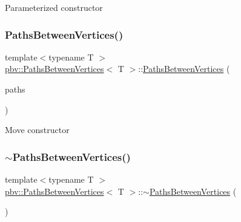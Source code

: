 Parameterized constructor \mbox{\label{structpbv_1_1_paths_between_vertices_a7b7fadc0fedb587ae9b7deb62ebb6a1c}} 
\subsubsection{\texorpdfstring{Paths\+Between\+Vertices()}{PathsBetweenVertices()}\hspace{0.1cm}{\footnotesize\ttfamily [4/4]}}
{\footnotesize\ttfamily template$<$typename T $>$ \\
\mbox{\hyperlink{structpbv_1_1_paths_between_vertices}{pbv\+::\+Paths\+Between\+Vertices}}$<$ T $>$\+::\mbox{\hyperlink{structpbv_1_1_paths_between_vertices}{Paths\+Between\+Vertices}} (\begin{DoxyParamCaption}\item[{\mbox{\hyperlink{structpbv_1_1_paths_between_vertices}{Paths\+Between\+Vertices}}$<$ T $>$ \&\&}]{paths }\end{DoxyParamCaption})\hspace{0.3cm}{\ttfamily [noexcept]}}

Move constructor \mbox{\label{structpbv_1_1_paths_between_vertices_a6be9fce23ff701beaf2a44006bd19e5b}} 
\subsubsection{\texorpdfstring{$\sim$\+Paths\+Between\+Vertices()}{~PathsBetweenVertices()}}
{\footnotesize\ttfamily template$<$typename T $>$ \\
\mbox{\hyperlink{structpbv_1_1_paths_between_vertices}{pbv\+::\+Paths\+Between\+Vertices}}$<$ T $>$\+::$\sim$\mbox{\hyperlink{structpbv_1_1_paths_between_vertices}{Paths\+Between\+Vertices}} (\begin{DoxyParamCaption}{ }\end{DoxyParamCaption})}



